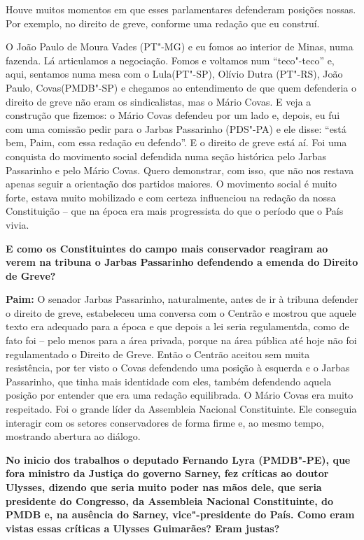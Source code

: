Houve muitos momentos em que esses parlamentares defenderam posições
nossas. Por exemplo, no direito de greve, conforme uma redação que eu
construí.

O João Paulo de Moura Vades (PT"-MG) e eu fomos ao interior de Minas,
numa fazenda. Lá articulamos a negociação. Fomos e voltamos num
``teco"-teco'' e, aqui, sentamos numa mesa com o Lula(PT"-SP), Olívio
Dutra (PT"-RS), João Paulo, Covas(PMDB"-SP) e chegamos ao entendimento de
que quem defenderia o direito de greve não eram os sindicalistas, mas o
Mário Covas. E veja a construção que fizemos: o Mário Covas defendeu por
um lado e, depois, eu fui com uma comissão pedir para o Jarbas
Passarinho (PDS"-PA) e ele disse: ``está bem, Paim, com essa redação eu
defendo''. E o direito de greve está aí. Foi uma conquista do movimento
social defendida numa seção histórica pelo Jarbas Passarinho e pelo
Mário Covas. Quero demonstrar, com isso, que não nos restava apenas
seguir a orientação dos partidos maiores. O movimento social é muito
forte, estava muito mobilizado e com certeza influenciou na redação da
nossa Constituição -- que na época era mais progressista do que o
período que o País vivia.

\textbf{E como os Constituintes do campo mais conservador reagiram ao
verem na tribuna o Jarbas Passarinho defendendo a emenda do Direito de
Greve?}

\textbf{Paim:} O senador Jarbas Passarinho, naturalmente, antes de ir à
tribuna defender o direito de greve, estabeleceu uma conversa com o
Centrão e mostrou que aquele texto era adequado para a época e que
depois a lei seria regulamentda, como de fato foi -- pelo menos para a
área privada, porque na área pública até hoje não foi regulamentado o
Direito de Greve. Então o Centrão aceitou sem muita resistência, por ter
visto o Covas defendendo uma posição à esquerda e o Jarbas Passarinho,
que tinha mais identidade com eles, também defendendo aquela posição por
entender que era uma redação equilibrada. O Mário Covas era muito
respeitado. Foi o grande líder da Assembleia Nacional Constituinte. Ele
conseguia interagir com os setores conservadores de forma firme e, ao
mesmo tempo, mostrando abertura ao diálogo.

\textbf{No inicio dos trabalhos o deputado Fernando Lyra (PMDB"-PE), que
fora ministro da Justiça do governo Sarney, fez críticas ao doutor
Ulysses, dizendo que seria muito poder nas mãos dele, que seria
presidente do Congresso, da Assembleia Nacional Constituinte, do PMDB e,
na ausência do Sarney, vice"-presidente do País. Como eram vistas essas
críticas a Ulysses Guimarães? Eram justas?}

